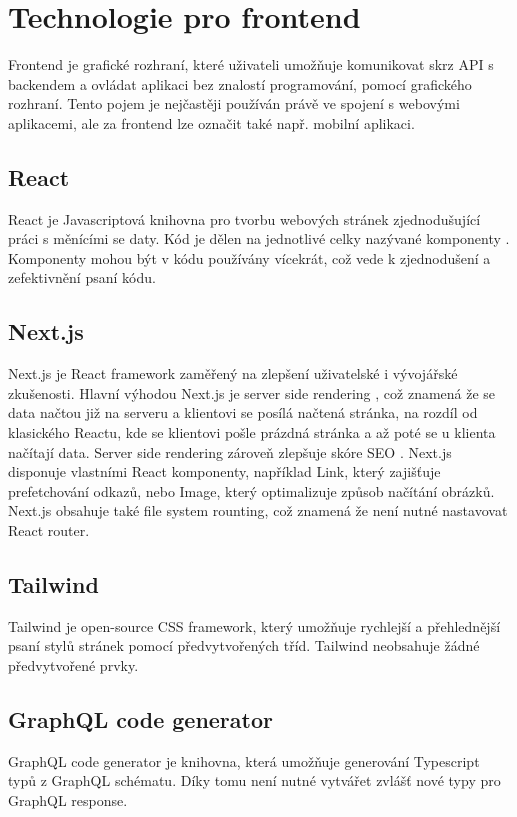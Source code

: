 \documentclass[12pt, a4paper,
 twoside,        %
 openright
]{report}
\begin{document}
\section{Technologie pro frontend}
Frontend je grafické rozhraní, které uživateli umožňuje komunikovat skrz API s backendem a ovládat aplikaci bez znalostí programování, pomocí grafického rozhraní. Tento pojem je nejčastěji používán právě ve spojení s webovými aplikacemi, ale za frontend lze označit také např. mobilní aplikaci. \cite{whatIsFrontend}
\subsection{React}
React je Javascriptová knihovna pro tvorbu webových stránek zjednodušující práci s měnícími se daty. Kód je dělen na jednotlivé celky nazývané komponenty \cite{reactComponentsAndProps}. Komponenty mohou být v kódu používány vícekrát, což vede k zjednodušení a zefektivnění psaní kódu. \cite{gettingStartedReact}
\subsection{Next.js}
Next.js je React framework zaměřený na zlepšení uživatelské i vývojářské zkušenosti. Hlavní výhodou Next.js je server side rendering \cite{whatIsSSR}, což znamená že se data načtou již na serveru a klientovi se posílá načtená stránka, na rozdíl od klasického Reactu, kde se klientovi pošle prázdná stránka a až poté se u klienta načítají data. Server side rendering zároveň zlepšuje skóre SEO \cite{whatIsSEO}. Next.js disponuje vlastními React komponenty, například Link, který zajišťuje prefetchování odkazů, nebo Image, který optimalizuje způsob načítání obrázků. Next.js obsahuje také file system rounting, což znamená že není nutné nastavovat React router. \cite{nextGetStarted}
\subsection{Tailwind}
Tailwind je open-source CSS framework, který umožňuje rychlejší a přehlednější psaní stylů stránek pomocí předvytvořených tříd. Tailwind neobsahuje žádné předvytvořené prvky.\cite{tailwindDocumentation}
\subsection{GraphQL code generator}
GraphQL code generator je knihovna, která umožňuje generování Typescript typů z GraphQL schématu. Díky tomu není nutné vytvářet zvlášť nové typy pro GraphQL response. \cite{graphqlCodeGeneratorDocs}
\end{document}
